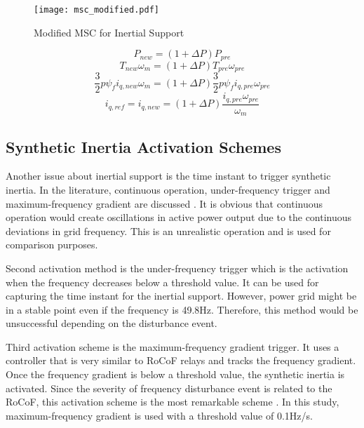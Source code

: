 \begin{figure}[h!]
	\centering
	\texttt{[image: msc\_modified.pdf]}
	\caption{Modified MSC for Inertial Support}
	\label{modifiedmsc}
\end{figure}
\begin{equation}
P_{new}=(1+\Delta P) P_{pre}
\label{inertialsupport1}
\end{equation}
\begin{equation}
T_{new} \omega_{m}=(1+\Delta P) T_{pre} \omega_{pre}
\label{inertialsupport2}
\end{equation}
\begin{equation}
\frac{3}{2} p \psi_{f} i_{q,new} \omega_{m}=(1+\Delta P) \frac{3}{2} p \psi_{f} i_{q,pre} \omega_{pre}
\label{inertialsupport3}
\end{equation}
\begin{equation}
 i_{q,ref}=i_{q,new}=(1+\Delta P) \frac{i_{q,pre} \omega_{pre}}{ \omega_{m}} 
\label{inertialsupport4}
\end{equation}
\subsection{Synthetic Inertia Activation Schemes}
Another issue about inertial support is the time instant to trigger synthetic inertia. In the literature, continuous operation, under-frequency trigger and maximum-frequency gradient are discussed \cite{Gonzalez-longatt2015}. It is obvious that continuous operation would create oscillations in active power output due to the continuous deviations in grid frequency. This is an unrealistic operation and is used for comparison purposes.\par
Second activation method is the under-frequency trigger which is the activation when the frequency decreases below a threshold value. It can be used for capturing the time instant for the inertial support. However, power grid might be in a stable point even if the frequency is 49.8Hz. Therefore, this method would be unsuccessful depending on the disturbance event. \par 
Third activation scheme is the maximum-frequency gradient trigger. It uses a controller that is very similar to RoCoF relays and tracks the frequency gradient. Once the frequency gradient is below a threshold value, the synthetic inertia is activated. Since the severity of frequency disturbance event is related to the RoCoF, this activation scheme is the most remarkable scheme \cite{Gonzalez-longatt2015}. In this study, maximum-frequency gradient is used with a threshold value of 0.1Hz/s. 
